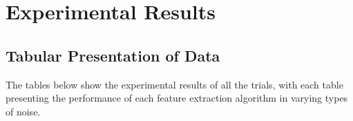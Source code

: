 
\chapter{Experimental Results} %

\label{Results} %


\section{Tabular Presentation of Data}

The tables below show the experimental results of all the trials, with each table presenting the performance of each feature extraction algorithm in varying types of noise.

